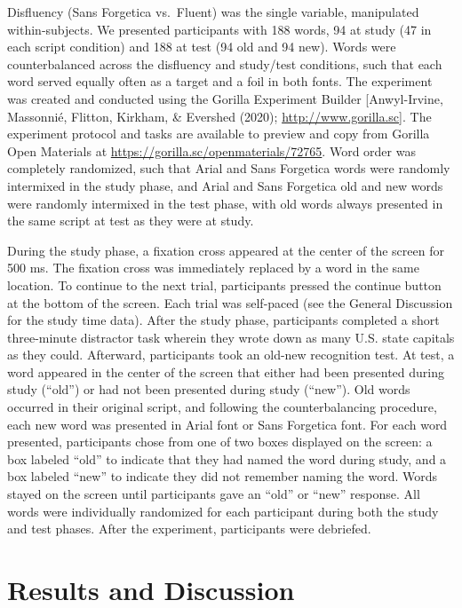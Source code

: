 \documentclass[jou]{apa6}
\begin{document}
Disfluency (Sans Forgetica vs.~Fluent) was the single variable, manipulated within-subjects. We presented participants with 188 words, 94 at study (47 in each script condition) and 188 at test (94 old and 94 new). Words were counterbalanced across the disfluency and study/test conditions, such that each word served equally often as a target and a foil in both fonts. The experiment was created and conducted using the Gorilla Experiment Builder {[}Anwyl-Irvine, Massonnié, Flitton, Kirkham, \& Evershed (2020); \url{http://www.gorilla.sc}{]}. The experiment protocol and tasks are available to preview and copy from Gorilla Open Materials at \url{https://gorilla.sc/openmaterials/72765}. Word order was completely randomized, such that Arial and Sans Forgetica words were randomly intermixed in the study phase, and Arial and Sans Forgetica old and new words were randomly intermixed in the test phase, with old words always presented in the same script at test as they were at study.

During the study phase, a fixation cross appeared at the center of the screen for 500 ms. The fixation cross was immediately replaced by a word in the same location. To continue to the next trial, participants pressed the continue button at the bottom of the screen. Each trial was self-paced (see the General Discussion for the study time data). After the study phase, participants completed a short three-minute distractor task wherein they wrote down as many U.S. state capitals as they could. Afterward, participants took an old-new recognition test. At test, a word appeared in the center of the screen that either had been presented during study (\enquote{old}) or had not been presented during study (\enquote{new}). Old words occurred in their original script, and following the counterbalancing procedure, each new word was presented in Arial font or Sans Forgetica font. For each word presented, participants chose from one of two boxes displayed on the screen: a box labeled \enquote{old} to indicate that they had named the word during study, and a box labeled \enquote{new} to indicate they did not remember naming the word. Words stayed on the screen until participants gave an \enquote{old} or \enquote{new} response. All words were individually randomized for each participant during both the study and test phases. After the experiment, participants were debriefed.

\hypertarget{results-and-discussion-2}{%
\section{Results and Discussion}\label{results-and-discussion-2}}
\end{document}
